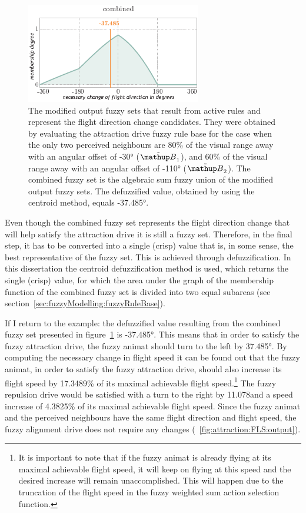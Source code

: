 \begin{figure}
\par\vspace*{2mm}
\includegraphics{fig[attractionFLScombined]g}
\par\vspace*{2mm}
\caption{The modified output fuzzy sets that result from active rules and represent the flight direction change candidates. They were obtained by evaluating the attraction drive fuzzy rule base for the case when the only two perceived neighbours are 80\% of the visual range away with an angular offset of \ang{-30} ($\fautom{B}_1$), and 60\% of the visual range away with an angular offset of \ang{-110} ($\fautom{B}_2$). The combined fuzzy set is the algebraic sum fuzzy union of the modified output fuzzy sets. The defuzzified value, obtained by using the centroid method, equals \ang{-37.485}.}
\label{fig:attraction:FLS:combined}
\end{figure}

Even though the combined fuzzy set represents the flight direction change that will help satisfy the attraction drive it is still a fuzzy set. Therefore, in the final step, it has to be converted into a single (crisp) value that is, in some sense, the best representative of the fuzzy set. This is achieved through defuzzification. In this dissertation the centroid defuzzification method is used, which  returns the single (crisp) value, for which the area under the graph of the membership function of the combined fuzzy set is divided into two equal subareas (see section~\ref{sec:fuzzyModelling:fuzzyRuleBase}).

If I return to the example: the defuzzified value resulting from the combined fuzzy set presented in figure~\ref{fig:attraction:FLS:combined} is \ang{-37.485}. This means that in order to satisfy the fuzzy attraction drive, the fuzzy animat should turn to the left by \ang{37.485}. By computing the necessary change in flight speed it can be found out that the fuzzy animat, in order to satisfy the fuzzy attraction drive, should also increase its flight speed by 17.3489\% of its maximal achievable flight speed.\footnote{It is important to note that if the fuzzy animat is already flying at its maximal achievable flight speed, it will keep on flying at this speed and the desired increase will remain unaccomplished. This will happen due to the truncation of the flight speed in the fuzzy weighted sum action selection function.} The fuzzy repulsion drive would be satisfied with a turn to the right by 11.078\deg and a speed increase of 4.3825\% of its maximal achievable flight speed. Since the fuzzy animat and the perceived neighbours have the same flight direction and flight speed, the fuzzy alignment drive does not require any changes (\fig~\ref{fig:attraction:FLS:output}). 

